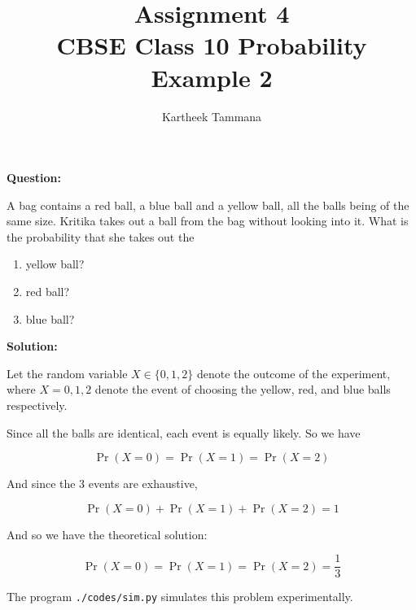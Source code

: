 \documentclass[journal, 12pt, twocolumn]{IEEEtran}
\title{Assignment 4 \\ CBSE Class 10 Probability \\ Example 2}
\author{Kartheek Tammana}
\providecommand{\pr}[1]{\ensuremath{\Pr\left(#1\right)}}
\begin{document}
\maketitle

\textbf{Question:}

A bag contains a red ball, a blue ball and a yellow ball, all the balls being of the same size.
Kritika takes out a ball from the bag without looking into it. What is the probability that she
takes out the

\begin{enumerate}[label=(\roman*)]
    \item yellow ball?
    \item red ball?
    \item blue ball?
\end{enumerate}

\textbf{Solution:}

Let the random variable $X \in \{0,1,2\}$ denote the outcome of the experiment, where $X = 0,1,2$
denote the event of choosing the yellow, red, and blue balls respectively.

Since all the balls are identical, each event is equally likely. So we have

\begin{equation}
    \pr{X=0} = \pr{X=1} = \pr{X=2}
\end{equation}

And since the 3 events are exhaustive,

\begin{equation}
    \pr{X=0} + \pr{X=1} + \pr{X=2} = 1
\end{equation}

And so we have the theoretical solution:

\begin{equation}
    \pr{X=0} = \pr{X=1} = \pr{X=2} = \frac{1}{3}
\end{equation}

The program \texttt{./codes/sim.py} simulates this problem experimentally.
\end{document}
